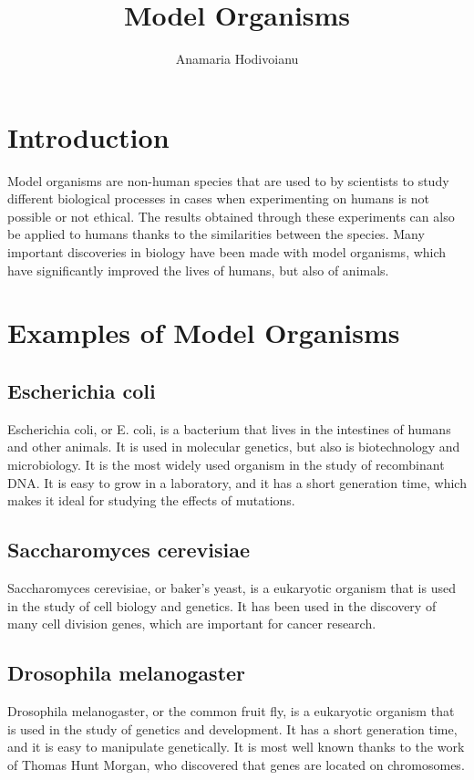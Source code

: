 \documentclass{article}
\title{Model Organisms}
\author{Anamaria Hodivoianu}
\begin{document}
\maketitle

\section{Introduction}
Model organisms are non-human species that are used to by scientists to study different biological processes in cases when experimenting on humans is not possible or not ethical. The results obtained through these experiments can also be applied to humans thanks to the similarities between the species. Many important discoveries in biology have been made with model organisms, which have significantly improved the lives of humans, but also of animals.

\section{Examples of Model Organisms}
\subsection{Escherichia coli}
Escherichia coli, or E. coli, is a bacterium that lives in the intestines of humans and other animals. It is used in molecular genetics, but also is biotechnology and microbiology. It is the most widely used organism in the study of recombinant DNA. It is easy to grow in a laboratory, and it has a short generation time, which makes it ideal for studying the effects of mutations.
\subsection{Saccharomyces cerevisiae}
Saccharomyces cerevisiae, or baker's yeast, is a eukaryotic organism that is used in the study of cell biology and genetics. It has been used in the discovery of many cell division genes, which are important for cancer research.
\subsection{Drosophila melanogaster}
Drosophila melanogaster, or the common fruit fly, is a eukaryotic organism that is used in the study of genetics and development. It has a short generation time, and it is easy to manipulate genetically. It is most well known thanks to the work of Thomas Hunt Morgan, who discovered that genes are located on chromosomes. 
\end{document}
